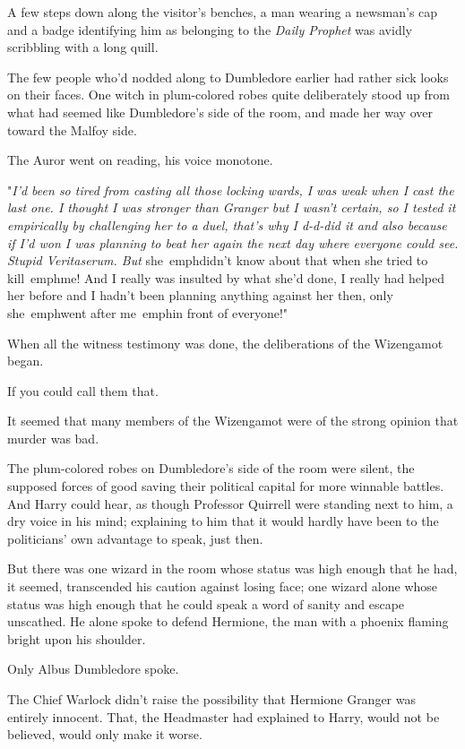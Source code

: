 A few steps down along the visitor's benches, a man wearing a newsman's cap and 
a badge identifying him as belonging to the \emph{Daily Prophet} was avidly 
scribbling with a long quill.

The few people who'd nodded along to Dumbledore earlier had rather sick looks 
on their faces. One witch in plum-colored robes quite deliberately stood up 
from what had seemed like Dumbledore's side of the room, and made her way over 
toward the Malfoy side.

The Auror went on reading, his voice monotone.

"\emph{I'd been so tired from casting all those locking wards, I was weak when I 
cast the last one. I thought I was stronger than Granger but I wasn't certain, 
so I tested it empirically by challenging her to a duel, that's why I d-d-did 
it and also because if I'd won I was planning to beat her again the next day 
where everyone could see. Stupid Veritaserum. But} she\ emph{didn't know about 
that when she tried to} kill\ emph{me! And I really was insulted by what she'd 
done, I really had helped her before and I hadn't been planning anything 
against her then, only} she\ emph{went after} me\ emph{in front of everyone!}"

When all the witness testimony was done, the deliberations of the Wizengamot 
began.

If you could call them that.

It seemed that many members of the Wizengamot were of the strong opinion that 
murder was bad.

The plum-colored robes on Dumbledore's side of the room were silent, the 
supposed forces of good saving their political capital for more winnable 
battles. And Harry could hear, as though Professor Quirrell were standing next 
to him, a dry voice in his mind; explaining to him that it would hardly have 
been to the politicians' own advantage to speak, just then.

But there was one wizard in the room whose status was high enough that he had, 
it seemed, transcended his caution against losing face; one wizard alone whose 
status was high enough that he could speak a word of sanity and escape 
unscathed. He alone spoke to defend Hermione, the man with a phoenix flaming 
bright upon his shoulder.

Only Albus Dumbledore spoke.

The Chief Warlock didn't raise the possibility that Hermione Granger was 
entirely innocent. That, the Headmaster had explained to Harry, would not be 
believed, would only make it worse.

